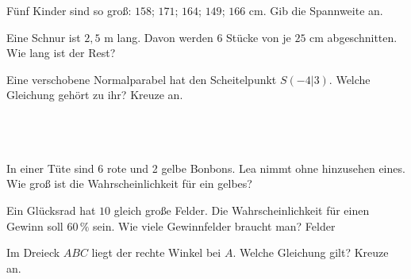\documentclass[11pt]{article}
\begin{document}
\begin{aufgabe}{Fünf Kinder sind so groß: $158$; $171$; $164$; $149$; $166$ cm. Gib die Spannweite an. \leerfeld[cm]}
\end{aufgabe}

\begin{aufgabe}{Eine Schnur ist $2{,}5$ m lang. Davon werden $6$ Stücke von je $25$ cm abgeschnitten. Wie lang ist der Rest? \leerfeld[cm]}
\end{aufgabe}

\begin{aufgabe}{Eine verschobene Normalparabel hat den Scheitelpunkt $S(-4|3)$. Welche Gleichung gehört zu ihr? Kreuze an.\\ \\ \\ \\ }
\end{aufgabe}

\begin{aufgabe}{In einer Tüte sind 6 rote und 2 gelbe Bonbons. Lea nimmt ohne hinzusehen eines. Wie groß ist die Wahrscheinlichkeit für ein gelbes? \leerfeld}
\end{aufgabe}

\begin{aufgabe}{Ein Glücksrad hat $10$ gleich große Felder. Die Wahrscheinlichkeit für einen Gewinn soll $60\,\%$ sein. Wie viele Gewinnfelder braucht man? \leerfeld Felder}
\end{aufgabe}

\begin{aufgabe}{Im Dreieck $ABC$ liegt der rechte Winkel bei $A$. Welche Gleichung gilt? Kreuze an. \\   }
\end{aufgabe}
\end{document}
